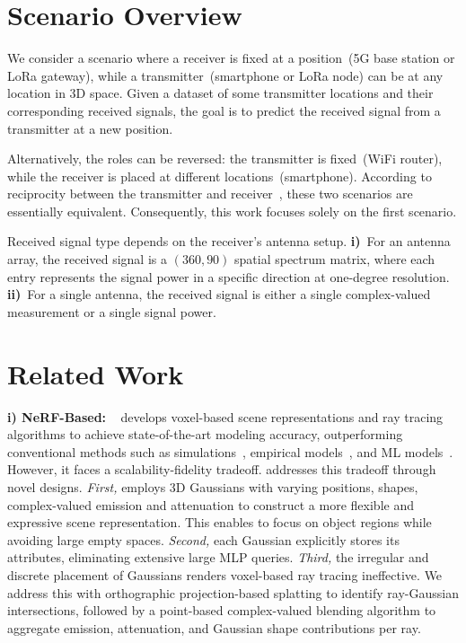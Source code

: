 



\section{Scenario Overview}


We consider a scenario where a receiver is fixed at a position~(\eg 5G base station or LoRa gateway), while a transmitter~(\eg smartphone or LoRa node) can be at any location in 3D space.
Given a dataset of some transmitter locations and their corresponding received signals, the goal is to predict the received signal from a transmitter at a new position.


Alternatively, the roles can be reversed: the transmitter is fixed~(\eg WiFi router), while the receiver is placed at different locations~(\eg smartphone).
According to reciprocity between the transmitter and receiver~\cite{liu2021fire}, these two scenarios are essentially equivalent.  
Consequently, this work focuses solely on the first scenario.



Received signal type depends on the receiver's antenna setup.  
\textbf{i)}~For an antenna array, the received signal is a \((360, 90)\) spatial spectrum matrix, where each entry represents the signal power in a specific direction at one-degree resolution.  
\textbf{ii)}~For a single antenna, the received signal is either a single complex-valued measurement or a single signal power.





\section{Related Work}\label{sec_relatedWork}


\textbf{i) NeRF-Based:}
\nerft~\cite{zhao2023nerf} develops voxel-based scene representations and ray tracing algorithms to achieve state-of-the-art modeling accuracy, outperforming conventional methods such as simulations~\cite{wirelessinsite_web, orekondy2022winert, RayTracingToolbox}, empirical models~\cite{rappaport1996wireless, parsons2012mobile, hata1980empirical}, and ML models~\cite{parralejo2021comparative, liu2021fire, malmirchegini2012spatial}.  
However, it faces a scalability-fidelity tradeoff.  
\ourSystem addresses this tradeoff through novel designs.
\textit{First,} \ourSystem employs 3D Gaussians with varying positions, shapes, complex-valued emission and attenuation to construct a more flexible and expressive scene representation.
This enables \ourSystem to focus on object regions while avoiding large empty spaces.
\textit{Second,} each Gaussian explicitly stores its attributes, eliminating extensive large MLP queries.
\textit{Third,} the irregular and discrete placement of Gaussians renders voxel-based ray tracing ineffective. 
We address this with orthographic projection-based splatting to identify ray-Gaussian intersections, followed by a point-based complex-valued blending algorithm to aggregate emission, attenuation, and Gaussian shape contributions per ray.



